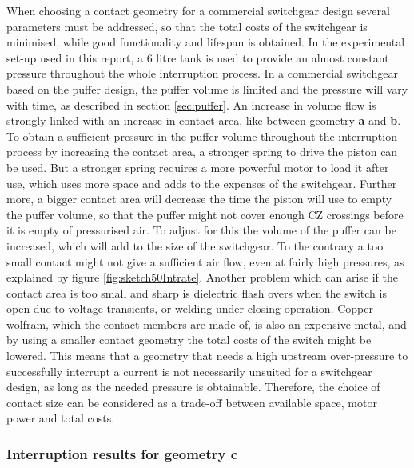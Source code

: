 \documentclass[10pt,b5paper,twoside]{article}
\begin{document}
When choosing a contact geometry for a commercial switchgear design several parameters must be addressed, so that the total costs of the switchgear is minimised, while good functionality and lifespan is obtained. In the experimental set-up used in this report, a 6 litre tank is used to provide an almost constant pressure throughout the whole interruption process. In a commercial switchgear based on the puffer design, the puffer volume is limited and the pressure will vary with time, as described in section \ref{sec:puffer}. An increase in volume flow is strongly linked with an increase in contact area, like between geometry \textbf{a} and \textbf{b}. To obtain a sufficient pressure in the puffer volume throughout the interruption process by increasing the contact area, a stronger spring to drive the piston can be used. But a stronger spring requires a more powerful motor to load it after use, which uses more space and adds to the expenses of the switchgear. Further more, a bigger contact area will decrease the time the piston will use to empty the puffer volume, so that the puffer might not cover enough CZ crossings before it is empty of pressurised air. To adjust for this the volume of the puffer can be increased, which will add to the size of the switchgear. To the contrary a too small contact might not give a sufficient air flow, even at fairly high pressures, as explained by figure \ref{fig:sketch50Intrate}. Another problem which can arise if the contact area is too small and sharp is dielectric flash overs when the switch is open due to voltage transients, or welding under closing operation. Copper-wolfram, which the contact members are made of, is also an expensive metal, and by using a smaller contact geometry the total costs of the switch might be lowered. This means that a geometry that needs a high upstream over-pressure to successfully interrupt a current is not necessarily unsuited for a switchgear design, as long as the needed pressure is obtainable. Therefore, the choice of contact size can be considered as a trade-off between available space, motor power and total costs.

\subsubsection{Interruption results for geometry \textbf{c}} \label{sec:intTestGeoC}
\end{document}
